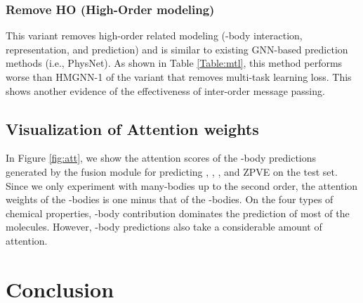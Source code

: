 \documentclass[conference]{IEEEtran}
\begin{document}
\subsubsection{Remove HO (High-Order modeling)} This variant removes high-order related modeling (-body interaction, representation, and prediction) and is similar to existing GNN-based prediction methods (i.e., PhysNet). As shown in Table \ref{Table:mtl}, this method performs worse than HMGNN-1 of the variant that removes multi-task learning loss. This shows another evidence of the effectiveness of inter-order message passing. 











\subsection{Visualization of Attention weights}

\begin{figure*}[t]
\centering
{}

\caption{Attention weights generate by the fusion module for predicting the four properties. }
\label{fig:att}
\end{figure*}

In Figure \ref{fig:att}, we show the attention scores of the -body predictions generated by the fusion module for predicting , , , and ZPVE on the test set. Since we only experiment with many-bodies up to the second order, the attention weights of the -bodies is one minus that of the -bodies. On the four types of chemical properties, -body contribution dominates the prediction of most of the molecules. However, -body predictions also take a considerable amount of attention. 

\section{Conclusion}
\end{document}
